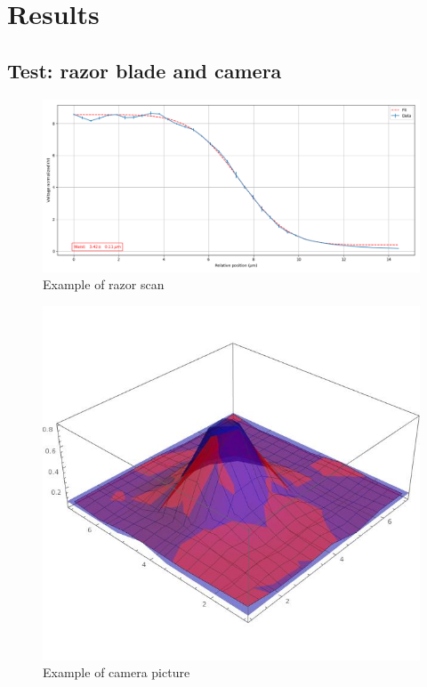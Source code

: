 \documentclass[english, a4paper, 12pt, twoside]{article}
\numberwithin{equation}{section} %
\begin{document}
\section{Results}
\subsection{Test: razor blade and camera}
\begin{figure}[H]
\centering
\includegraphics[width=\textwidth]{img/prova7}
\caption{Example of razor scan}
\end{figure}
\begin{figure}[H]
\centering
\includegraphics[width=\textwidth]{img/camera}
\caption{Example of camera picture}
\end{figure}
\end{document}
